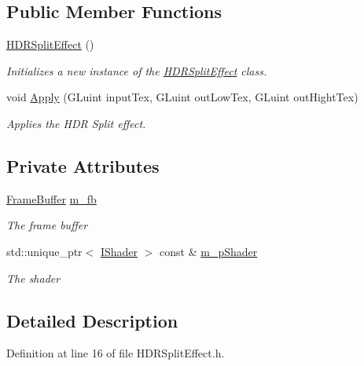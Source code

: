 \subsection*{Public Member Functions}
\begin{DoxyCompactItemize}
\item 
\hyperlink{class_h_d_r_split_effect_a7e1d872b1706879054a0c6a245d62cfb}{H\+D\+R\+Split\+Effect} ()
\begin{DoxyCompactList}\small\item\em Initializes a new instance of the \hyperlink{class_h_d_r_split_effect}{H\+D\+R\+Split\+Effect} class. \end{DoxyCompactList}\item 
void \hyperlink{class_h_d_r_split_effect_ab2f8295e2f9efbfe5889c837c4c1854e}{Apply} (G\+Luint input\+Tex, G\+Luint out\+Low\+Tex, G\+Luint out\+Hight\+Tex)
\begin{DoxyCompactList}\small\item\em Applies the H\+DR Split effect. \end{DoxyCompactList}\end{DoxyCompactItemize}
\subsection*{Private Attributes}
\begin{DoxyCompactItemize}
\item 
\hyperlink{class_frame_buffer}{Frame\+Buffer} \hyperlink{class_h_d_r_split_effect_a3bfac50a5086d2b5c8dda9b4f41e5bcb}{m\+\_\+fb}
\begin{DoxyCompactList}\small\item\em The frame buffer \end{DoxyCompactList}\item 
std\+::unique\+\_\+ptr$<$ \hyperlink{class_i_shader}{I\+Shader} $>$ const \& \hyperlink{class_h_d_r_split_effect_a9287e35ef3eb82b745d8474e455913d0}{m\+\_\+p\+Shader}
\begin{DoxyCompactList}\small\item\em The shader \end{DoxyCompactList}\end{DoxyCompactItemize}


\subsection{Detailed Description}


Definition at line 16 of file H\+D\+R\+Split\+Effect.\+h.



